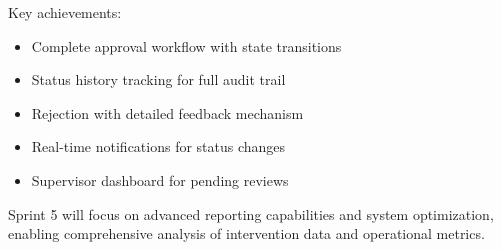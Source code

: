 Key achievements:
\begin{itemize}
\item Complete approval workflow with state transitions
\item Status history tracking for full audit trail
\item Rejection with detailed feedback mechanism
\item Real-time notifications for status changes
\item Supervisor dashboard for pending reviews
\end{itemize}

Sprint 5 will focus on advanced reporting capabilities and system optimization, enabling comprehensive analysis of intervention data and operational metrics.